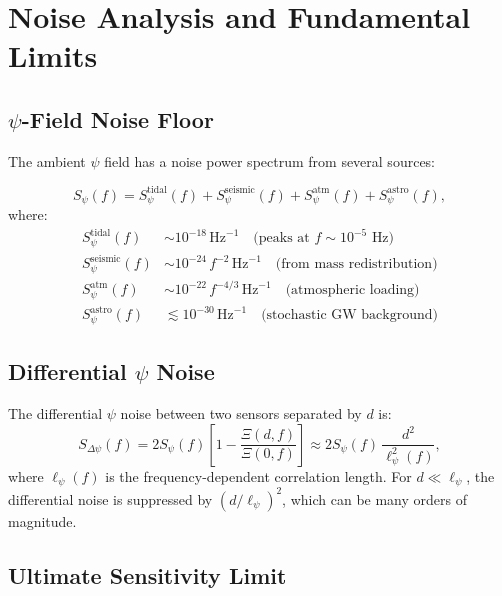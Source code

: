 \documentclass[12pt,a4paper]{article}
\theoremstyle{remark}
\begin{document}
\section{Noise Analysis and Fundamental Limits}\label{sec:noise}

\subsection{$\psi$-Field Noise Floor}

The ambient $\psi$ field has a noise power spectrum from several sources:

\begin{equation}
S_\psi(f) = S_\psi^{\text{tidal}}(f) + S_\psi^{\text{seismic}}(f) +
S_\psi^{\text{atm}}(f) + S_\psi^{\text{astro}}(f),
\label{eq:psi-noise-spectrum}
\end{equation}
where:
\begin{align}
S_\psi^{\text{tidal}}(f) &\sim 10^{-18}\,\text{Hz}^{-1} \quad
\text{(peaks at $f \sim 10^{-5}$ Hz)} \\
S_\psi^{\text{seismic}}(f) &\sim 10^{-24}\,f^{-2}\,\text{Hz}^{-1} \quad
\text{(from mass redistribution)} \\
S_\psi^{\text{atm}}(f) &\sim 10^{-22}\,f^{-4/3}\,\text{Hz}^{-1} \quad
\text{(atmospheric loading)} \\
S_\psi^{\text{astro}}(f) &\lesssim 10^{-30}\,\text{Hz}^{-1} \quad
\text{(stochastic GW background)}
\end{align}

\subsection{Differential $\psi$ Noise}

The differential $\psi$ noise between two sensors separated by $d$ is:
\begin{equation}
S_{\Delta\psi}(f) = 2S_\psi(f)\left[1 - \frac{\Xi(d, f)}{\Xi(0, f)}\right]
\approx 2S_\psi(f)\,\frac{d^2}{\ell_\psi^2(f)},
\label{eq:diff-noise}
\end{equation}
where $\ell_\psi(f)$ is the frequency-dependent correlation length. For
$d \ll \ell_\psi$, the differential noise is suppressed by $(d/\ell_\psi)^2$,
which can be many orders of magnitude.

\subsection{Ultimate Sensitivity Limit}
\end{document}
